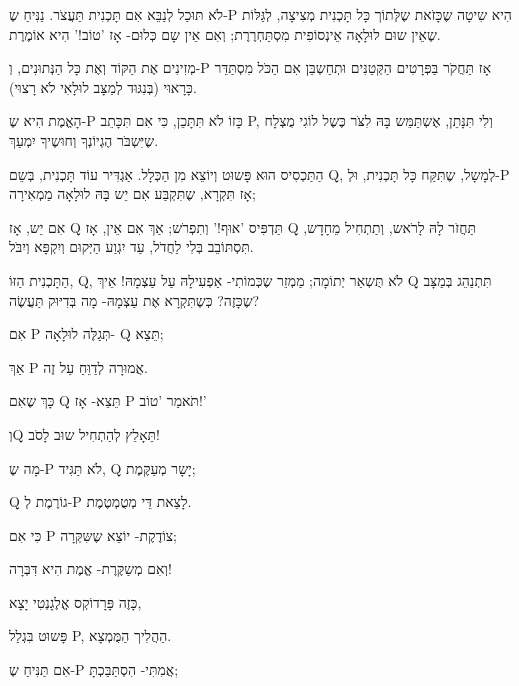 לֹא תּוּכַל לְנַבֵּא אִם תָּכְנִית תַּעֲצֹר.
נַנִּיחַ שֶ-P הִיא שִיטָה שֶכָּזֹאת
שֶלְּתוֹך כָּל תָּכְנִית מְצִיצָה, לְגַּלּוֹת
שֶאֵין שוּם לוּלָאָה אֵינְסוֹפִית מִסְתַּחְרֶרֶת;
וְאִם אֵין שָם כְּלוּם- אָז 'טוֹב!' הִיא אוֹמֶרֶת.

מְזִינִים אֶת הַקּוֹד וְאֶת כָּל הַנְּתוּנִים,
וְ-P אָז תַּחֲקֹר בַּפְּרָטִים הַקְּטַנִּים
וּתְחַשְבֵּן אִם הַכֹּל מִסְתַּדֵּר כָּרָאוּי
(בְּנִגּוּד לְמַצָּב לוּלָאִי לֹא רָצוּי).

הָאֱמֶת הִיא שֶ-P כָּזוֹ לֹא תִּתָּכֵן,
כִּי אִם תִּכָּתֵב P, וְלִי תִּנָּתֵן,
אֶשְתַּמֵּש בָּהּ לִצֹּר כֶּשֶל לוֹגִי מֻצְלָח
שֶיִּשְבֹּר הֶגְיוֹנְךָ וְחוּשֶיךָ יִמְעַךְ.
\leavevmode
\newline

הַתַּכְסִיס הוּא פָּשוּט וְיוֹצֵא מִן הַכְּלָל.
אַגְדִּיר עוֹד תָּכְנִית, בְּשֵם Q, לְמָשָל,
שֶתִּקַּח כָּל תָּכְנִית, וּלְ-P אָז תִּקְרָא,
שֶתִּקְבַּע אִם יֵש בָּהּ לוּלָאָה מַמְאִירָה;
\leavevmode
\newline

אִם יֵש, אָז Q תַּדְפִּיס 'אוּף!' וְתִפְרֹש;
אַךְ אִם אֵין, אָז Q תַּחֲזֹר לָהּ לָרֹאש,
וְתַתְחִיל מֵחָדָש, תִּסְתּוֹבֵב בְּלִי לַחֲדֹל,
עַד יִגְוַע הַיְּקוּם וְיִקְפָּא וְיִבֹּל.

\leavevmode
\newline

הַתָּכְנִית הַזּוֹ, Q, לֹא תֻּשְאַר יְתוֹמָה;
מַמְזֵר שֶכְּמוֹתִי- אַפְעִילָהּ עַל עַצְמָהּ!
אֵיךְ Q תִּתְנַהֵג בְּמַצָּב שֶכָּזֶה?
כְּשֶתִּקְרָא אֶת עַצְמָהּ- מָה בְּדִיּוּק תַּעֲשֶׂה?
\leavevmode
\newline

אִם P תְּגַלֶּה לוּלָאָה- Q תֵּצֵא;

אַךְ P אֲמוּרָה לְדַוֵּחַ עַל זֶה.

כָּךְ שֶאִם Q תֵּצֵא- אָז P תֹּאמַר 'טוֹב!'

וְQ תֵּאָלֵץ לְהַתְחִיל שוּב לָסֹב!
\leavevmode
\newline

מָה שֶ-P לֹא תַּגִּיד, Q יָשָר מְעַקֶּמֶת;

Q גוֹרֶמֶת לְ-P לָצֵאת דֵּי מְטֻמְטֶמֶת.

כִּי אִם P צוֹדֶקֶת- יוֹצֵא שֶשִּקְּרָה;
\leavevmode
\newline

וְאִם מְשַקֶּרֶת- אֱמֶת הִיא דִּבְּרָה!

כָּזֶה פָּרָדוֹקְס אֱלֶגָנְטִי יָצָא,

פָּשוּט בִּגְלַל P, הַהֲלִיך הַמֻּמְצָא.

אִם תַּנִּיחַ שֶ-P אֲמִתִּי- הִסְתַּבַּכְתָּ;

